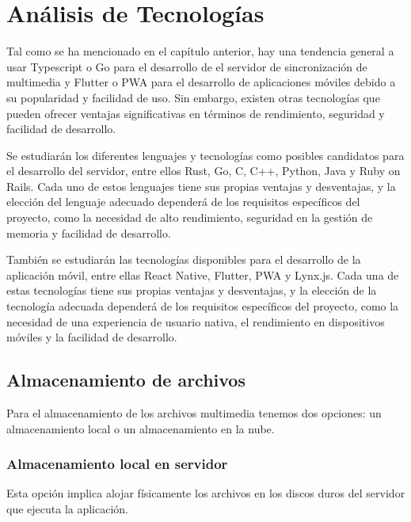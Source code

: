 \newpage
\chapter{Análisis de Tecnologías}
\label{sec:tecnologias}


Tal como se ha mencionado en el capítulo anterior, hay una tendencia general a usar Typescript o Go para el desarrollo de el servidor de sincronización de multimedia y Flutter o PWA para el desarrollo de aplicaciones móviles debido a su popularidad y facilidad de uso.
Sin embargo, existen otras tecnologías que pueden ofrecer ventajas significativas en términos de rendimiento, seguridad y facilidad de desarrollo.

Se estudiarán los diferentes lenguajes y tecnologías como posibles candidatos para el desarrollo del servidor, entre ellos Rust, Go, C, C++, Python, Java y Ruby on Rails. Cada uno de estos lenguajes tiene sus propias ventajas y desventajas, y la elección del lenguaje adecuado dependerá de los requisitos específicos del proyecto, como la necesidad de alto rendimiento, seguridad en la gestión de memoria y facilidad de desarrollo.

También se estudiarán las tecnologías disponibles para el desarrollo de la aplicación móvil, entre ellas React Native, Flutter, PWA y Lynx.js. Cada una de estas tecnologías tiene sus propias ventajas y desventajas, y la elección de la tecnología adecuada dependerá de los requisitos específicos del proyecto, como la necesidad de una experiencia de usuario nativa, el rendimiento en dispositivos móviles y la facilidad de desarrollo.

\section{Almacenamiento de archivos}

Para el almacenamiento de los archivos multimedia tenemos dos opciones: un almacenamiento local o un almacenamiento en la nube.

\subsection{Almacenamiento local en servidor}
Esta opción implica alojar físicamente los archivos en los discos duros del servidor que ejecuta la aplicación.

